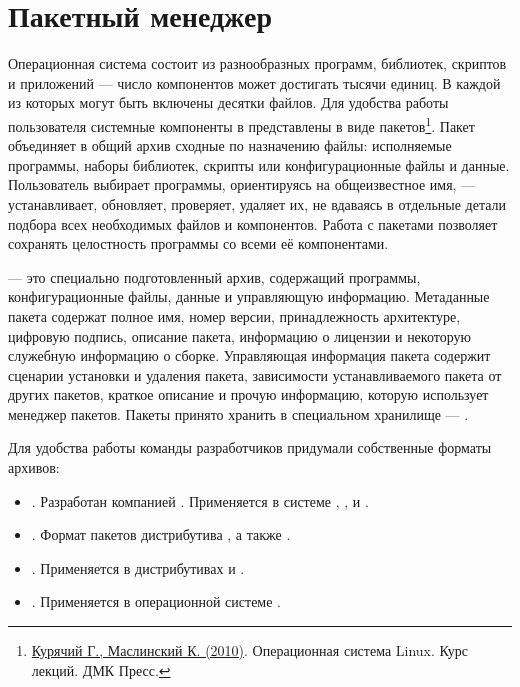 \chapter{Пакетный менеджер}\label{package-manager}
Операционная система состоит из разнообразных программ, библиотек, скриптов и приложений --- 
число компонентов может достигать тысячи единиц. В каждой из которых могут быть включены десятки файлов. 
Для удобства работы пользователя системные компоненты в  представлены в виде 
пакетов\footnote{\href{https://docs.altlinux.org/books/altlibrary-linuxintro2.pdf}{Курячий Г., Маслинский К. (2010)}. 
	Операционная система Linux. Курс лекций. ДМК Пресс.}. Пакет объединяет в общий архив сходные по назначению файлы: исполняемые программы, наборы библиотек, скрипты или конфигурационные файлы и данные.
Пользователь выбирает программы, ориентируясь на общеизвестное имя, --- устанавливает, обновляет, проверяет,
удаляет их, не вдаваясь в отдельные детали подбора всех необходимых файлов и компонентов.
Работа с пакетами позволяет сохранять целостность программы со всеми её компонентами.

 --- это специально подготовленный архив, содержащий программы, конфигурационные файлы, 
данные и управляющую информацию. Метаданные пакета содержат полное имя, номер версии, принадлежность
архитектуре, цифровую подпись, описание пакета, информацию о лицензии и некоторую служебную информацию
о сборке. Управляющая информация пакета содержит сценарии установки и удаления пакета, зависимости
устанавливаемого пакета от других пакетов, краткое описание и прочую информацию, которую использует
менеджер пакетов. Пакеты принято хранить в специальном хранилище --- .

Для удобства работы команды разработчиков придумали собственные форматы архивов:

\begin{itemize}
	\item {}. Разработан компанией . Применяется в системе , ,  и .
	\item {}. Формат пакетов дистрибутива , а также .
	\item {}. Применяется в дистрибутивах  и .
	\item {}. Применяется в операционной системе .
\end{itemize}


